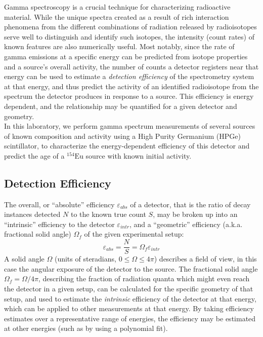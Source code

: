 \documentclass[12pt]{article}
\newcommand{\EuSrc}{$\mathrm{^{154}Eu}$\xspace}
\begin{document}
Gamma spectroscopy is a crucial technique for characterizing radioactive material.
While the unique spectra created as a result of rich interaction phenomena from the different combinations of radiation released by radioisotopes serve well to distinguish and identify such isotopes, the intensity (count rates) of known features are also numerically useful.
Most notably, since the rate of gamma emissions at a specific energy can be predicted from isotope properties and a source's overall activity, the number of counts a detector registers near that energy can be used to estimate a \emph{detection efficiency} of the spectrometry system at that energy, and thus predict the activity of an identified radioisotope from the spectrum the detector produces in response to a source.
This efficiency is energy dependent, and the relationship may be quantified for a given detector and geometry.\\

In this laboratory, we perform gamma spectrum measurements of several sources of known composition and activity using a High Purity Germanium (HPGe) scintillator, to characterize the energy-dependent efficiency of this detector and predict the age of a \EuSrc source with known initial activity.

\subsection{Detection Efficiency}
The overall, or ``absolute'' efficiency $\varepsilon_{abs}$ of a detector, that is the ratio of decay instances detected $N$ to the known true count $S$, may be broken up into an ``intrinsic'' efficiency to the detector $\varepsilon_{intr}$, and a ``geometric'' efficiency (a.k.a. fractional solid angle) $\Omega_f$ of the given experimental setup:
\begin{equation}
    \label{eq:abs-eff}
    \varepsilon_{abs} = \frac{N}{S} = \Omega_f \varepsilon_{intr}
\end{equation}
A solid angle $\Omega$ (units of steradians, $0\leq\Omega\leq4\pi$) describes a field of view, in this case the angular exposure of the detector to the source.
The fractional solid angle $\Omega_f=\Omega/4\pi$, describing the fraction of radiation quanta which might even reach the detector in a given setup, can be calculated for the specific geometry of that setup, and used to estimate the \emph{intrinsic} efficiency of the detector at that energy, which can be applied to other measurements at that energy.
By taking efficiency estimates over a representative range of energies, the efficiency may be estimated at other energies (such as by using a polynomial fit).
\end{document}
